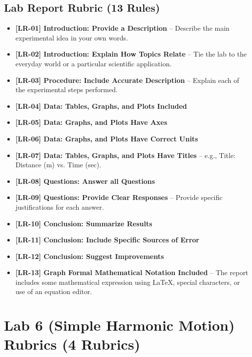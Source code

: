 \documentclass{article}
\begin{document}
\subsection*{Lab Report Rubric (13 Rules)}
\begin{itemize}
\item \textbf{ [LR-01] Introduction: Provide a Description } –  Describe the main experimental idea in your own words.
\item \textbf{ [LR-02] Introduction:  Explain How Topics Relate } – Tie the lab to the everyday world or a particular scientific application.
\item \textbf{ [LR-03] Procedure: Include Accurate Description } – Explain each of the experimental steps performed.
\item \textbf{ [LR-04] Data: Tables, Graphs, and Plots Included }
\item \textbf{ [LR-05] Data:  Graphs, and Plots Have Axes }
\item \textbf{ [LR-06] Data: Graphs, and Plots Have Correct Units }
\item \textbf{ [LR-07] Data: Tables, Graphs, and Plots Have Titles } – e.g., Title: Distance (m) vs. Time (sec).
\item \textbf{ [LR-08] Questions:  Answer all Questions } 
\item \textbf{ [LR-09] Questions:  Provide Clear Responses } – Provide specific justifications for each answer.
\item \textbf{ [LR-10] Conclusion:  Summarize Results }
\item \textbf{ [LR-11] Conclusion:  Include Specific Sources of Error }
\item \textbf{ [LR-12] Conclusion:  Suggest Improvements }
\item \textbf{ [LR-13] Graph Formal Mathematical Notation Included } –  The report includes some mathematical expression using LaTeX, special characters, or use of an equation editor. 
\end{itemize}

\section*{Lab 6 (Simple Harmonic Motion) Rubrics (4 Rubrics)}
\end{document}
